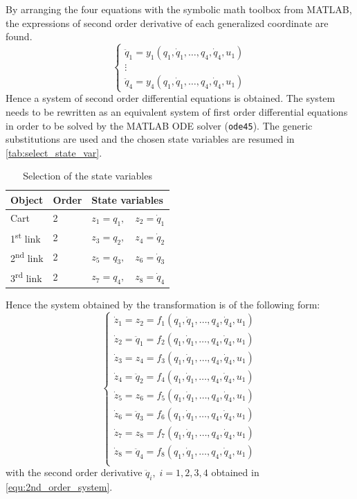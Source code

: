 \documentclass[a4paper,12pt]{article}
\begin{document}
By arranging the four equations with the symbolic math toolbox from MATLAB, the expressions of second order derivative of each generalized coordinate are found. 
\begin{equation} \label{equ:2nd_order_system}
	\left\{
	\begin{array}{*{20}{c}}
	\ddot q_1 = y_1 (q_1,\dot q_1, \ldots, q_4,\dot q_4, u_1)\\
	\vdots \\
	\ddot q_4 = y_4 (q_1,\dot q_1, \ldots, q_4,\dot q_4, u_1)
	\end{array}
	\right.
\end{equation}
Hence a system of second order differential equations is obtained. The system needs to be rewritten as an equivalent system of first order differential equations in order to be solved by the MATLAB ODE solver (\texttt{ode45}). The generic substitutions are used and the chosen state variables are resumed in \autoref{tab:select_state_var}.
\begin{table}[H]
	\centering
	\caption{Selection of the state variables}
	\label{tab:select_state_var}
	\begin{tabular}{@{}lll@{}}
	\toprule
	Object                     & Order & State variables                   \\ \midrule
	Cart                       & 2     & $z_1 = q_1, \quad z_2 = \dot q_1$ \\
	1\textsuperscript{st} link & 2     & $z_3 = q_2, \quad z_4 = \dot q_2$ \\
	2\textsuperscript{nd} link & 2     & $z_5 = q_3, \quad z_6 = \dot q_3$ \\
	3\textsuperscript{rd} link & 2     & $z_7 = q_4, \quad z_8 = \dot q_4$ \\ \bottomrule
	\end{tabular}
\end{table}
Hence the system obtained by the transformation is of the following form:
\begin{equation} \label{equ:model_final}
	\left\{
	\begin{array}{*{20}{c}}
		\dot z_1 = z_2       = f_1(q_1,\dot q_1,\ldots, q_4,\dot q_4, u_1) \\
		\dot z_2 = \ddot q_1 = f_2(q_1,\dot q_1,\ldots, q_4,\dot q_4, u_1) \\
		\dot z_3 = z_4       = f_3(q_1,\dot q_1,\ldots, q_4,\dot q_4, u_1) \\
		\dot z_4 = \ddot q_2 = f_4(q_1,\dot q_1,\ldots, q_4,\dot q_4, u_1) \\
		\dot z_5 = z_6       = f_5(q_1,\dot q_1,\ldots, q_4,\dot q_4, u_1) \\
		\dot z_6 = \ddot q_3 = f_6(q_1,\dot q_1,\ldots, q_4,\dot q_4, u_1) \\
		\dot z_7 = z_8       = f_7(q_1,\dot q_1,\ldots, q_4,\dot q_4, u_1) \\
		\dot z_8 = \ddot q_4 = f_8(q_1,\dot q_1,\ldots, q_4,\dot q_4, u_1) \\
	\end{array}
	\right.
\end{equation}
with the second order derivative $\ddot q_i,\; i=1,2,3,4$ obtained in \eqref{equ:2nd_order_system}.
\end{document}
